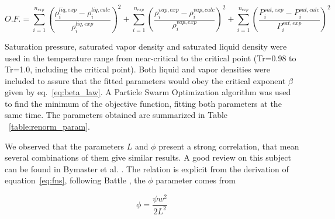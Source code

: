 \documentclass[preprint,12pt,3p]{elsarticle}
\begin{document}
\begin{equation}   \label{eq:OF}
O.F.=\sum_{i=1}^{n_{exp}} \left(\frac{\rho_{i}^{liq,exp}-\rho_{i}^{liq,calc}}{\rho_{i}^{liq,exp}}\right)^2 + \sum_{i=1}^{n_{exp}} \left(\frac{\rho_{i}^{vap,exp}-\rho_{i}^{vap,calc}}{\rho_{i}^{vap,exp}}\right)^2 + \sum_{i=1}^{n_{exp}} \left(\frac{P_{i}^{sat,exp}-P_{i}^{sat,calc}}{P_{i}^{sat,exp}}\right)^2
\end{equation}

    Saturation pressure, saturated vapor density and saturated liquid density were used in the temperature range from near-critical to the critical point (Tr=0.98 to Tr=1.0, including the critical point). Both liquid and vapor densities were included to assure that the fitted parameters would obey the critical exponent $\beta$ given by eq.~\ref{eq:beta_law}. A Particle Swarm Optimization algorithm was used to find the minimum of the objective function, fitting both parameters at the same time. The parameters obtained are summarized in Table ~\ref{table:renorm_param}.
    
\begin{table}[ht!]
\centering
\caption{Estimated Parameters for the renormalization method}
\label{table:renorm_param}
\end{table}

	We observed that the parameters $L$ and $\phi$ present a strong correlation, that mean several combinations of them give similar results. A good review on this subject can be found in Bymaster et al. \citep{bymaster2008renormalization}. The relation is explicit from the derivation of equation~\ref{eq:fns}, following Battle \cite{battlerenorm}, the $\phi$ parameter comes from
	
\begin{equation} \label{eq:fns_battle}
    \phi = \frac{\psi w^2}{2L^2}
\end{equation}
\end{document}
